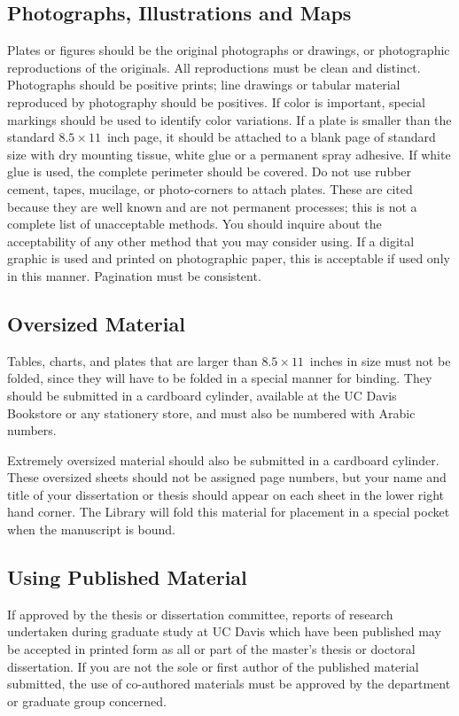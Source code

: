 \subsection{Photographs, Illustrations and Maps}
%
Plates or figures should be the original photographs or drawings, or photographic reproductions of the originals. All reproductions must be clean and distinct. Photographs should be positive prints; line drawings or tabular material reproduced by photography should be positives. If color is important, special markings should be used to identify color variations. If a plate is smaller than the standard $8.5\times 11$~inch page, it should be attached to a blank page of standard size with dry mounting tissue, white glue or a permanent spray adhesive. If white glue is used, the complete perimeter should be covered. Do not use rubber cement, tapes, mucilage, or photo-corners to attach plates. These are cited because they are well known and are not permanent processes; this is not a complete list of unacceptable methods. You should inquire about the acceptability of any other method that you may consider using. If a digital graphic is used and printed on photographic paper, this is acceptable if used only in this manner. Pagination must be consistent.

\subsection{Oversized Material}
%
Tables, charts, and plates that are larger than $8.5\times 11$~inches in size must not be folded, since they will have to be folded in a special manner for binding. They should be submitted in a cardboard cylinder, available at the UC Davis Bookstore or any stationery store, and must also be numbered with Arabic numbers.

Extremely oversized material should also be submitted in a cardboard cylinder. These oversized sheets should not be assigned page numbers, but your name and title of your dissertation or thesis should appear on each sheet in the lower right hand corner. The Library will fold this material for placement in a special pocket when the manuscript is bound.

\subsection{Using Published Material}
%
If approved by the thesis or dissertation committee, reports of research undertaken during graduate study at UC Davis which have been published may be accepted in printed form as all or part of the master's thesis or doctoral dissertation. If you are not the sole or first author of the published material submitted, the use of co-authored materials must be approved by the department or graduate group concerned.

